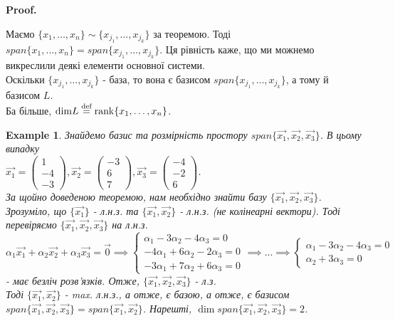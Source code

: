 \documentclass[a4paper, 10pt]{article}
\makeatletter
\theoremstyle{theoremdd}
\newtheorem{example}[theorem]{Example}
\renewenvironment{proof}[1][Proof.\\]{\par
\pushQED{\hfill \qed}%
\normalfont \topsep6\p@\@plus6\p@\relax
\trivlist
\item\relax
{\bfseries
#1\@addpunct{.}}\hspace\labelsep\ignorespaces
}{%
\popQED\endtrivlist\@endpefalse
}
\makeatother
\begin{document}
	\begin{proof}
	Маємо $\{x_1,\dots,x_n\} \sim \{x_{j_1},\dots,x_{j_k}\}$ за теоремою. Тоді $span \{x_1,\dots,x_n\} = span \{ x_{j_1},\dots,x_{j_k} \}$. Ця рівність каже, що ми можнемо викреслили деякі елементи основної системи.\\
	Оскільки $\{x_{j_1},\dots,x_{j_k}\}$ - база, то вона є базисом $span \{ x_{j_1},\dots,x_{j_k} \}$, а тому й базисом $L$.\\
	Ба більше, $\textrm{dim} {L} \overset{\text{def}}{=} \rank \{x_1,\dots,x_n\}$.
	\end{proof}
	\fi
	
	\begin{example}
	Знайдемо базис та розмірність простору $span \{ \vec{x_1}, \vec{x_2}, \vec{x_3} \}$. В цьому випадку\\
	$\vec{x_1} = \begin{pmatrix}
	1 \\ -4 \\ -3
	\end{pmatrix}, \vec{x_2} = \begin{pmatrix}
	-3 \\ 6 \\ 7
	\end{pmatrix}, \vec{x_3} = \begin{pmatrix}
	-4 \\ -2 \\ 6
	\end{pmatrix}$.\\
	За щойно доведеною теоремою, нам необхідно знайти базу $\{\vec{x_1},\vec{x_2},\vec{x_3} \}$. Зрозуміло, що $\{\vec{x_1}\}$ - л.н.з. та $\{\vec{x_1}, \vec{x_2}\}$ - л.н.з. (не колінеарні вектори). Тоді перевіряємо $\{\vec{x_1},\vec{x_2},\vec{x_3} \}$ на л.н.з.\\
	$\alpha_1 \vec{x_1} + \alpha_2 \vec{x_2} + \alpha_3 \vec{x_3} = \vec{0} \implies 		\begin{cases}
	\alpha_1 - 3 \alpha_2 - 4 \alpha_3 = 0 \\
	-4\alpha_1 + 6 \alpha_2 - 2 \alpha_3 = 0 \\
	-3\alpha_1 + 7 \alpha_2 + 6 \alpha_3 = 0
	\end{cases} \implies \dots \implies \begin{cases} \alpha_1 - 3 \alpha_2 - 4 \alpha_3 = 0 \\ \alpha_2 + 3 \alpha_3 = 0 \end{cases}$ - має безліч розв'язків. Отже, $\{\vec{x_1},\vec{x_2},\vec{x_3}\}$ - л.з.\\
	Тоді $\{\vec{x_1},\vec{x_2}\}$ - max. л.н.з., а отже, є базою, а отже, є базисом $span \{\vec{x_1},\vec{x_2},\vec{x_3} \} = span \{\vec{x_1},\vec{x_2} \}$. Нарешті, $\dim span \{\vec{x_1},\vec{x_2},\vec{x_3}\} = 2$.
	\end{example}
	
\end{document}

